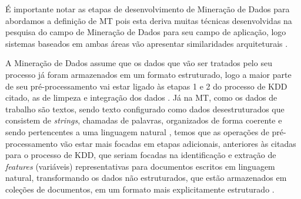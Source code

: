 
É importante notar as etapas de desenvolvimento de Mineração de Dados para abordamos a definição de MT pois esta deriva muitas técnicas desenvolvidas na pesquisa do campo de Mineração de Dados para seu campo de aplicação, logo sistemas baseados em ambas áreas vão apresentar similaridades arquiteturais \cite{Feldman:2006:TMH:1076381}. 



A Mineração de Dados assume que os dados que vão ser tratados pelo seu processo já foram armazenados em um formato estruturado, logo a maior parte de seu pré-processamento vai estar ligado às etapas 1 e 2 do processo de KDD citado, as de limpeza e integração dos dados \cite{Feldman:2006:TMH:1076381}. 
Já na MT, como os dados de trabalho são textos, sendo texto configurado como dados desestruturados que consistem de \textit{strings}, chamadas de palavras, organizados de forma coerente e sendo pertencentes a uma linguagem natural \cite{Jo2018TMCIBDC}, temos que as operações de pré-processamento vão estar mais focadas em etapas adicionais, anteriores às citadas para o processo de KDD, que seriam focadas na identificação e extração de \textit{features} (variáveis) representativas para documentos escritos em linguagem natural, transformando os dados não estruturados, que estão armazenados em coleções de documentos, em um formato mais explicitamente estruturado \cite{Feldman:2006:TMH:1076381}.



